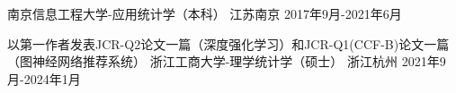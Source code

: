 \begin{educventries}
  \educventry
    {} %
    {南京信息工程大学-应用统计学（本科）} %
    {江苏南京} %
    {2017年9月-2021年6月} %

  \educventry
    {以第一作者发表JCR-Q2论文一篇（深度强化学习）和JCR-Q1(CCF-B)论文一篇（图神经网络推荐系统）} %
    {浙江工商大学-理学统计学（硕士）} %
    {浙江杭州} %
    {2021年9月-2024年1月} %

\end{educventries}
